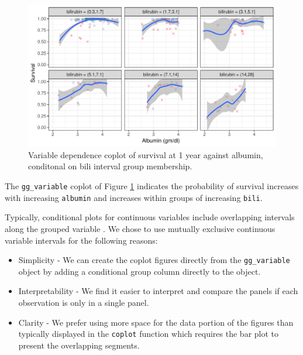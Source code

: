 \documentclass[article, nojss]{jss}
\begin{document}
\begin{Schunk}
\begin{figure}[!htb]

{\centering \includegraphics{rfs-bili-coplot-1}

}

\caption[Variable dependence coplot of survival at 1 year against albumin, conditonal on bili interval group membership]{Variable dependence coplot of survival at 1 year against albumin, conditonal on bili interval group membership.}\label{fig:bili-coplot}
\end{figure}
\end{Schunk}

The \texttt{gg\_variable} coplot of Figure \ref{fig:bili-coplot}
indicates the probability of survival increases with increasing
\texttt{albumin} and increases within groups of increasing
\texttt{bili}.

Typically, conditional plots for continuous variables include
overlapping intervals along the grouped variable \citep{cleveland:1993}.
We chose to use mutually exclusive continuous variable intervals for the
following reasons:

\begin{itemize}
\item
  Simplicity - We can create the coplot figures directly from the
  \texttt{gg\_variable} object by adding a conditional group column
  directly to the object.
\item
  Interpretability - We find it easier to interpret and compare the
  panels if each observation is only in a single panel.
\item
  Clarity - We prefer using more space for the data portion of the
  figures than typically displayed in the \texttt{coplot} function which
  requires the bar plot to present the overlapping segments.
\end{itemize}
\end{document}
